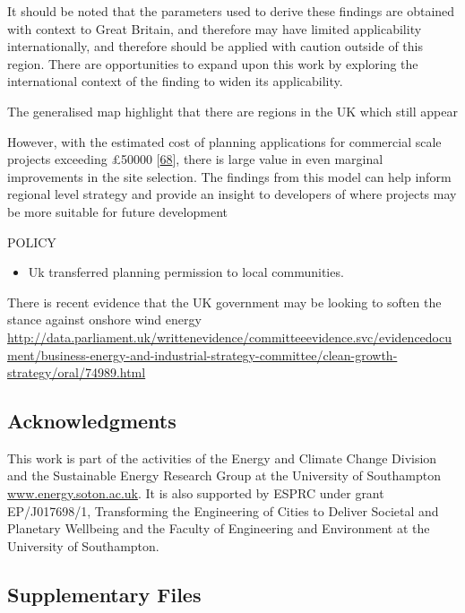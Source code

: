 \documentclass[a4paper,]{article}
\providecommand{\tightlist}{%
  \setlength{\itemsep}{0pt}\setlength{\parskip}{0pt}}
\theoremstyle{definition}
\theoremstyle{definition}
\theoremstyle{definition}
\theoremstyle{remark}
\begin{document}
It should be noted that the parameters used to derive these findings are
obtained with context to Great Britain, and therefore may have limited
applicability internationally, and therefore should be applied with
caution outside of this region. There are opportunities to expand upon
this work by exploring the international context of the finding to widen
its applicability.

The generalised map highlight that there are regions in the UK which
still appear

However, with the estimated cost of planning applications for commercial
scale projects exceeding \pounds 50000
{[}\protect\hyperlink{ref-RF2016}{68}{]}, there is large value in even
marginal improvements in the site selection. The findings from this
model can help inform regional level strategy and provide an insight to
developers of where projects may be more suitable for future development

POLICY

\begin{itemize}
\tightlist
\item
  Uk transferred planning permission to local communities.
\end{itemize}

There is recent evidence that the UK government may be looking to soften
the stance against onshore wind energy
\url{http://data.parliament.uk/writtenevidence/committeeevidence.svc/evidencedocument/business-energy-and-industrial-strategy-committee/clean-growth-strategy/oral/74989.html}

\subsection*{Acknowledgments}\label{acknowledgments}

This work is part of the activities of the Energy and Climate Change
Division and the Sustainable Energy Research Group at the University of
Southampton \url{www.energy.soton.ac.uk}. It is also supported by ESPRC
under grant EP/J017698/1, Transforming the Engineering of Cities to
Deliver Societal and Planetary Wellbeing and the Faculty of Engineering
and Environment at the University of Southampton.

\subsection*{Supplementary Files}\label{supplementary-files}
\end{document}
